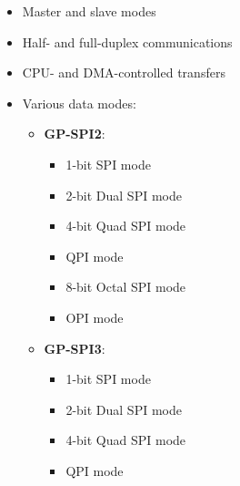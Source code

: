 \documentclass[main\_\_EN.tex]{subfiles}
\begin{document}
\begin{itemize}
    \item Master and slave modes
    \item Half- and full-duplex communications
    \item CPU- and DMA-controlled transfers
    \item Various data modes:
        \begin{itemize}
            \item \textbf{GP-SPI2}:
            \begin{itemize}
                \item 1-bit SPI mode
                \item 2-bit Dual SPI mode
                \item 4-bit Quad SPI mode
                \item QPI mode
                \item 8-bit Octal SPI mode
                \item OPI mode
        \end{itemize}
            \item \textbf{GP-SPI3}:
            \begin{itemize}
                \item 1-bit SPI mode
                \item 2-bit Dual SPI mode
                \item 4-bit Quad SPI mode
                \item QPI mode
        \end{itemize}
        \end{itemize}


\end{itemize}
\end{document}

